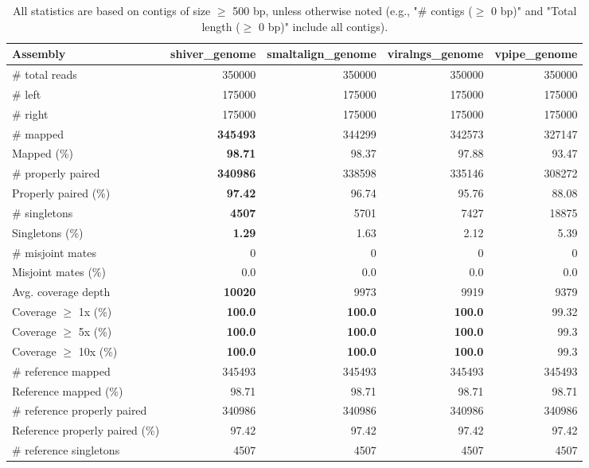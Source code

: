 \documentclass[12pt,a4paper]{article}
\begin{document}
\begin{table}[ht]
\begin{center}
\caption{All statistics are based on contigs of size $\geq$ 500 bp, unless otherwise noted (e.g., "\# contigs ($\geq$ 0 bp)" and "Total length ($\geq$ 0 bp)" include all contigs).}
\begin{tabular}{|l*{4}{|r}|}
\hline
Assembly & shiver\_genome & smaltalign\_genome & viralngs\_genome & vpipe\_genome \\ \hline
\# total reads & 350000 & 350000 & 350000 & 350000 \\ \hline
\# left & 175000 & 175000 & 175000 & 175000 \\ \hline
\# right & 175000 & 175000 & 175000 & 175000 \\ \hline
\# mapped & {\bf 345493} & 344299 & 342573 & 327147 \\ \hline
Mapped (\%) & {\bf 98.71} & 98.37 & 97.88 & 93.47 \\ \hline
\# properly paired & {\bf 340986} & 338598 & 335146 & 308272 \\ \hline
Properly paired (\%) & {\bf 97.42} & 96.74 & 95.76 & 88.08 \\ \hline
\# singletons & {\bf 4507} & 5701 & 7427 & 18875 \\ \hline
Singletons (\%) & {\bf 1.29} & 1.63 & 2.12 & 5.39 \\ \hline
\# misjoint mates & 0 & 0 & 0 & 0 \\ \hline
Misjoint mates (\%) & 0.0 & 0.0 & 0.0 & 0.0 \\ \hline
Avg. coverage depth & {\bf 10020} & 9973 & 9919 & 9379 \\ \hline
Coverage $\geq$ 1x (\%) & {\bf 100.0} & {\bf 100.0} & {\bf 100.0} & 99.32 \\ \hline
Coverage $\geq$ 5x (\%) & {\bf 100.0} & {\bf 100.0} & {\bf 100.0} & 99.3 \\ \hline
Coverage $\geq$ 10x (\%) & {\bf 100.0} & {\bf 100.0} & {\bf 100.0} & 99.3 \\ \hline
\# reference mapped & 345493 & 345493 & 345493 & 345493 \\ \hline
Reference mapped (\%) & 98.71 & 98.71 & 98.71 & 98.71 \\ \hline
\# reference properly paired & 340986 & 340986 & 340986 & 340986 \\ \hline
Reference properly paired (\%) & 97.42 & 97.42 & 97.42 & 97.42 \\ \hline
\# reference singletons & 4507 & 4507 & 4507 & 4507 \\ \hline

\end{tabular}
\end{center}
\end{table}
\end{document}
